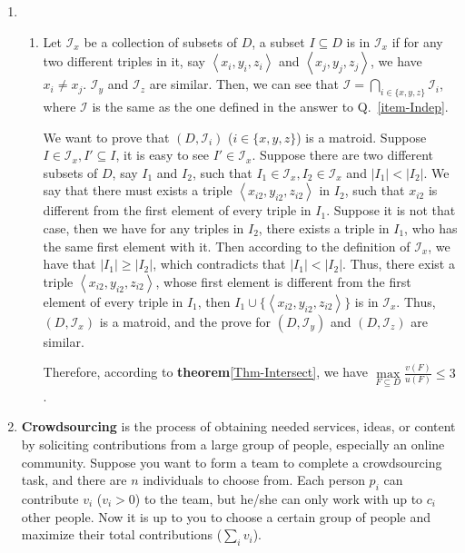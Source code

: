 \documentclass[12pt,a4paper]{article}
\makeatletter
\newtheorem*{solution}{Solution}
\theoremstyle{definition}
\renewenvironment{solution}[1][Solution] {\par\pushQED{\qed}\normalfont\topsep6\p@\@plus6\p@\relax\trivlist\item[\hskip\labelsep\bfseries#1\@addpunct{.}]\ignorespaces}{\popQED\endtrivlist\@endpefalse} \makeatother
\makeatother
\begin{document}
\begin{enumerate}
\begin{solution}
\begin{enumerate}
				\item Let $\mathcal{I}_{x}$ be a collection of subsets of $D$, a subset $I \subseteq D$ is in $\mathcal{I}_{x}$ if for any two different triples in it, say $\left\langle x_i,y_i,z_i \right\rangle$ and $\left\langle x_j,y_j,z_j \right\rangle$, we have $x_i \neq x_j$. $\mathcal{I}_{y}$ and $\mathcal{I}_{z}$ are similar. Then, we can see that $\mathcal{I}=\bigcap_{i\in\{x,y,z\}} \mathcal{I}_{i}$, where $\mathcal{I}$ is the same as the one defined in the answer to Q.~\ref{item-Indep}.
				
				We want to prove that $(D,\mathcal{I}_{i})$ ($i \in \{x,y,z\}$) is a matroid. Suppose $I \in \mathcal{I}_{x}, I' \subseteq I$, it is easy to see $I' \in \mathcal{I}_{x}$. Suppose there are two different subsets of $D$, say $I_1$ and $I_2$, such that $I_1 \in \mathcal{I}_{x}, I_2 \in \mathcal{I}_{x}$ and $|I_1| < |I_2|$. We say that there must exists a triple $\left\langle x_{i2},y_{i2},z_{i2} \right\rangle$ in $I_2$, such that $x_{i2}$ is different from the first element of every triple in $I_1$. Suppose it is not that case, then we have for any triples in $I_2$, there exists a triple in $I_1$, who has the same first element with it. Then according to the definition of $\mathcal{I}_{x}$, we have that $|I_1| \geq |I_2|$, which contradicts that $|I_1| < |I_2|$. Thus, there exist a triple $\left\langle x_{i2},y_{i2},z_{i2} \right\rangle$, whose first element is different from the first element of every triple in $I_1$, then $I_1 \cup \{\left\langle x_{i2},y_{i2},z_{i2}\right\rangle\}$ is in $\mathcal{I}_{x}$. Thus, $(D,\mathcal{I}_{x})$ is a matroid, and the prove for $(D,\mathcal{I}_{y})$ and $(D,\mathcal{I}_{z})$ are similar.
				
				Therefore, according to \textbf{theorem}\ref{Thm-Intersect}, we have $\max\limits_{F \subseteq D} \frac{v(F)}{u(F)} \leq 3$.
			\end{enumerate}
		\end{solution}
		
		
		
		\item
		\textbf{Crowdsourcing} is the process of obtaining needed services, ideas, or content by soliciting contributions from a large group of people, especially an online community. Suppose you want to form a team to complete a crowdsourcing task, and there are $n$ individuals to choose from. Each person $p_i$ can contribute $v_i$ ($v_i > 0$) to the team, but he/she can only work with up to $c_i$ other people. Now it is up to you to choose a certain group of people and maximize their total contributions ($\sum_i{v_i}$).
		

\end{enumerate}
\end{document}
